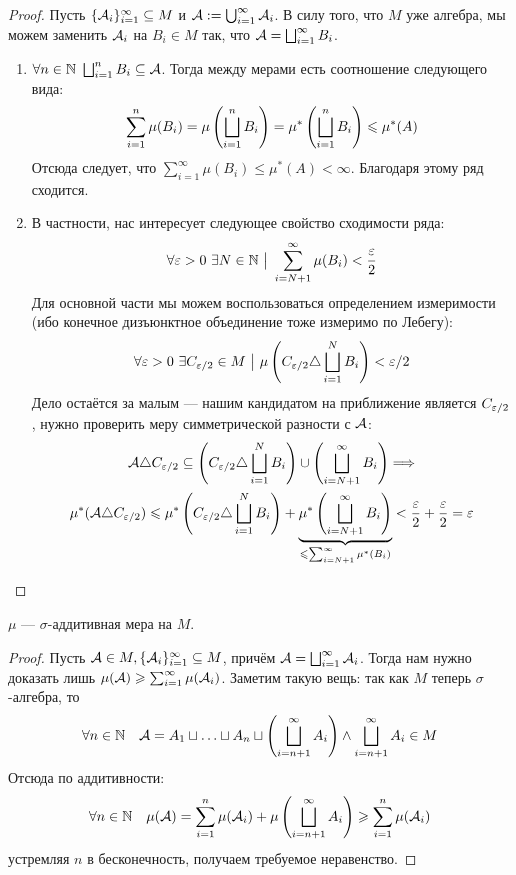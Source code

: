 \begin{proof}
	Пусть $\{\mathcal{A}_i\}_{i = 1}^\infty \subseteq M$ и $\mathcal{A} := \bigcup_{i = 1}^\infty \mathcal{A}_i$. В силу того, что $M$ уже алгебра, мы можем заменить $\mathcal{A}_i$ на $B_i \in M$ так, что $\mathcal{A} = \bigsqcup_{i = 1}^\infty B_i$.
	\begin{enumerate}
		\item $\forall n \in \mathbb{N}\ \bigsqcup_{i = 1}^n B_i \subseteq \mathcal{A}$. Тогда между мерами есть соотношение следующего вида:
		\[
			\sum_{i = 1}^n \mu(B_i) = \mu\left(\bigsqcup_{i = 1}^n B_i\right) = \mu^*\left(\bigsqcup_{i = 1}^n B_i\right) \leqslant \mu^*(A)
		\]
		Отсюда следует, что $\sum_{i = 1}^\infty \mu(B_i) \le \mu^*(A) < \infty$. Благодаря этому ряд сходится.
		
		\item В частности, нас интересует следующее свойство сходимости ряда:
		\[
			\forall \varepsilon > 0\ \exists N \in \mathbb{N} \ \big|\  \sum_{i = N + 1}^\infty \mu(B_i) < \frac{\varepsilon}{2}
		\]
		Для основной части мы можем воспользоваться определением измеримости (ибо конечное дизъюнктное объединение тоже измеримо по Лебегу):
		\[
			\forall \varepsilon > 0\ \exists C_{\varepsilon / 2} \in M \ \big|\  \mu\left(C_{\varepsilon / 2} \triangle \bigsqcup_{i = 1}^N B_i\right) < \varepsilon / 2
		\]
		Дело остаётся за малым --- нашим кандидатом на приближение является $C_{\varepsilon / 2}$, нужно проверить меру симметрической разности с $\mathcal{A}$:
		\begin{multline*}
			\mathcal{A} \triangle C_{\varepsilon / 2} \subseteq \left(C_{\varepsilon / 2} \triangle \bigsqcup_{i = 1}^N B_i\right) \cup \left(\bigsqcup_{i = N + 1}^\infty B_i\right) \Longrightarrow
			\\
			\mu^*(\mathcal{A} \triangle C_{\varepsilon / 2}) \leqslant \mu^*\left(C_{\varepsilon / 2} \triangle \bigsqcup_{i = 1}^N B_i\right) + \underbrace{\mu^*\left(\bigsqcup_{i = N + 1}^\infty B_i\right)}_{\leqslant \sum_{i = N + 1}^\infty \mu^*(B_i)} < \frac{\varepsilon}{2} + \frac{\varepsilon}{2} = \varepsilon
		\end{multline*}
	\end{enumerate}
\end{proof}

\begin{theorem}
	$\mu$ --- $\sigma$-аддитивная мера на $M$.
\end{theorem}

\begin{proof}
	Пусть $\mathcal{A} \in M, \{\mathcal{A}_i\}_{i = 1}^\infty \subseteq M$, причём $\mathcal{A} = \bigsqcup_{i = 1}^\infty \mathcal{A}_i$. Тогда нам нужно доказать лишь $\mu(\mathcal{A}) \geqslant \sum_{i = 1}^\infty \mu(\mathcal{A}_i)$. Заметим такую вещь: так как $M$ теперь $\sigma$-алгебра, то
	\[
		\forall n \in \mathbb{N} \quad \mathcal{A} = A_1 \sqcup \ldots \sqcup A_n \sqcup \left(\bigsqcup_{i = n + 1}^\infty A_i\right) \wedge \bigsqcup_{i = n + 1}^\infty A_i \in M
	\]
	Отсюда по аддитивности:
	\[
		\forall n \in \mathbb{N} \quad \mu(\mathcal{A}) = \sum_{i = 1}^n \mu(\mathcal{A}_i) + \mu\left(\bigsqcup_{i = n + 1}^\infty A_i\right) \geqslant \sum_{i = 1}^n \mu(\mathcal{A}_i)
	\]
	устремляя $n$ в бесконечность, получаем требуемое неравенство.
\end{proof}

